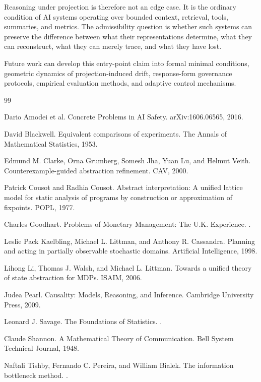 \documentclass[11pt]{article}
\begin{document}
Reasoning under projection is therefore not an edge case. It is the ordinary condition of AI systems operating over bounded context, retrieval, tools, summaries, and metrics. The admissibility question is whether such systems can preserve the difference between what their representations determine, what they can reconstruct, what they can merely trace, and what they have lost.

Future work can develop this entry-point claim into formal minimal conditions, geometric dynamics of projection-induced drift, response-form governance protocols, empirical evaluation methods, and adaptive control mechanisms.

\begin{thebibliography}{99}

Dario Amodei et al.
\newblock Concrete Problems in AI Safety.
\newblock arXiv:1606.06565, 2016.

David Blackwell.
\newblock Equivalent comparisons of experiments.
\newblock The Annals of Mathematical Statistics, 1953.

Edmund M. Clarke, Orna Grumberg, Somesh Jha, Yuan Lu, and Helmut Veith.
\newblock Counterexample-guided abstraction refinement.
\newblock CAV, 2000.

Patrick Cousot and Radhia Cousot.
\newblock Abstract interpretation: A unified lattice model for static analysis of programs by construction or approximation of fixpoints.
\newblock POPL, 1977.

Charles Goodhart.
\newblock Problems of Monetary Management: The U.K. Experience.
.

Leslie Pack Kaelbling, Michael L. Littman, and Anthony R. Cassandra.
\newblock Planning and acting in partially observable stochastic domains.
\newblock Artificial Intelligence, 1998.

Lihong Li, Thomas J. Walsh, and Michael L. Littman.
\newblock Towards a unified theory of state abstraction for MDPs.
\newblock ISAIM, 2006.

Judea Pearl.
\newblock Causality: Models, Reasoning, and Inference.
\newblock Cambridge University Press, 2009.

Leonard J. Savage.
\newblock The Foundations of Statistics.
.

Claude Shannon.
\newblock A Mathematical Theory of Communication.
\newblock Bell System Technical Journal, 1948.

Naftali Tishby, Fernando C. Pereira, and William Bialek.
\newblock The information bottleneck method.
.

\end{thebibliography}
\end{document}
